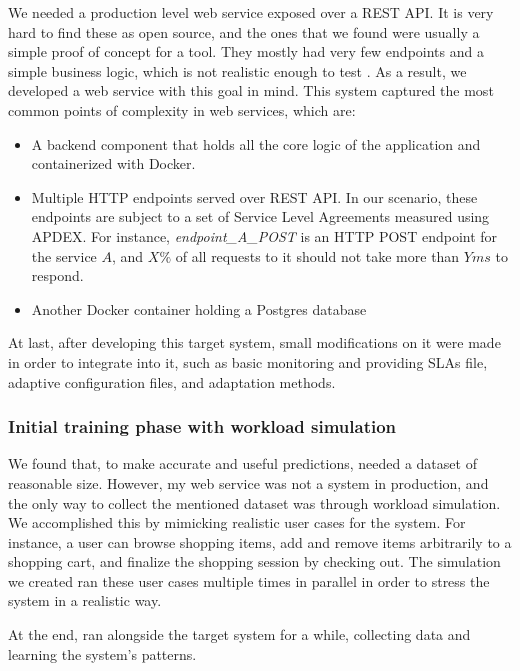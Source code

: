 We needed a production level web service exposed over a REST API. It is very hard to find these as open source, and the ones that we found were usually a simple proof of concept for a tool. They mostly had very few endpoints and a simple business logic, which is not realistic enough to test \projectname{}. As a result, we developed a web service with this goal in mind. This system captured the most common points of complexity in web services, which are:

\begin{itemize}
  \item A backend component that holds all the core logic of the application and containerized with Docker.
  \item Multiple HTTP endpoints served over REST API. In our scenario, these endpoints are subject to a set of Service Level Agreements measured using APDEX. For instance, \textit{endpoint\_A\_POST} is an HTTP POST endpoint for the service $A$, and $X\%$ of all requests to it should not take more than $Y ms$ to respond.
  \item Another Docker container holding a Postgres database
\end{itemize}

At last, after developing this target system, small modifications on it were made in order to integrate \projectname{} into it, such as basic monitoring and providing SLAs file, adaptive configuration files, and adaptation methods.

\subsubsection{Initial training phase with workload simulation}


We found that, to make accurate and useful predictions, \projectname{} needed a dataset of reasonable size. However, my web service was not a system in production, and the only way to collect the mentioned dataset was through workload simulation. We accomplished this by mimicking realistic user cases for the system. For instance, a user can browse shopping items, add and remove  items arbitrarily to a shopping cart, and finalize the shopping session by checking out. The simulation we created ran these user cases multiple times in parallel in order to stress the system in a realistic way. 

At the end, \projectname{} ran alongside the target system for a while, collecting data and learning the system's patterns.


